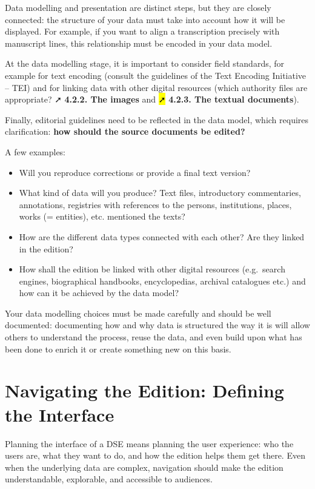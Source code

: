 \documentclass[
  letterpaper,
  DIV=11,
  numbers=noendperiod]{scrreprt}
\begin{document}
Data modelling and presentation are distinct steps, but they are closely
connected: the structure of your data must take into account how it will
be displayed. For example, if you want to align a transcription
precisely with manuscript lines, this relationship must be encoded in
your data model.

At the data modelling stage, it is important to consider field
standards, for example for text encoding (consult the guidelines of the
Text Encoding Initiative -- TEI) and for linking data with other digital
resources (which authority files are appropriate? ➚ \textbf{4.2.2. The
images} and \hl{➚} \textbf{4.2.3. The textual documents}).

Finally, editorial guidelines need to be reflected in the data model,
which requires clarification: \textbf{how should the source documents be
edited?}

A few examples:

\begin{itemize}
\item
  Will you reproduce corrections or provide a final text version?
\item
  What kind of data will you produce? Text files, introductory
  commentaries, annotations, registries with references to the persons,
  institutions, places, works (= entities), etc. mentioned the texts?
\item
  How are the different data types connected with each other? Are they
  linked in the edition?
\item
  How shall the edition be linked with other digital resources
  (e.g.~search engines, biographical handbooks, encyclopedias, archival
  catalogues etc.) and how can it be achieved by the data model?
\end{itemize}

Your data modelling choices must be made carefully and should be well
documented: documenting how and why data is structured the way it is
will allow others to understand the process, reuse the data, and even
build upon what has been done to enrich it or create something new on
this basis.

\section{Navigating the Edition: Defining the
Interface}\label{navigating-the-edition-defining-the-interface}

Planning the interface of a DSE means planning the user experience: who
the users are, what they want to do, and how the edition helps them get
there. Even when the underlying data are complex, navigation should make
the edition understandable, explorable, and accessible to audiences.
\end{document}
